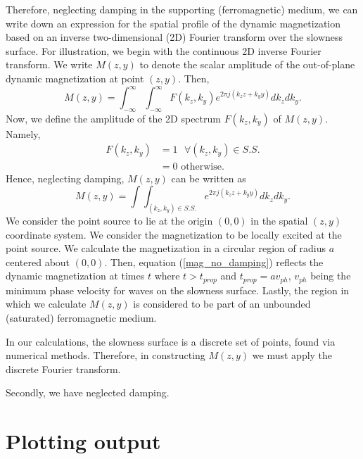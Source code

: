 \documentclass{article}
\begin{document}
Therefore, neglecting damping in the supporting (ferromagnetic) medium, we can write down an expression for the spatial profile of the dynamic magnetization based on an inverse two-dimensional (2D) Fourier transform over the slowness surface. 
For illustration, we begin with the continuous 2D inverse Fourier transform.
We write $M(z , y)$ to denote the scalar amplitude of the out-of-plane dynamic magnetization at point $(z, y)$. Then,
\begin{equation}
M(z,y) = \int_{-\infty}^{\infty} \int_{-\infty}^{\infty} F(k_{z},k_{y}) e^{2 \pi j (k_{z} z + k_{y} y)} dk_{z} dk_{y} .
\end{equation}
Now, we define the amplitude of the 2D spectrum $F(k_{z},k_{y})$ of $M(z , y)$. Namely,
\begin{align}
F(k_{z},k_{y}) &= 1 \text{  } \forall (k_{z},k_{y}) \in S.S. \\
&= 0 \text{ otherwise.}
\end{align}
Hence, neglecting damping, $M(z, y)$ can be written as
\begin{equation}\label{mag_no_damping}
M(z,y) = \int\int_{(k_{z},k_{y}) \in S.S.} e^{2 \pi j (k_{z} z + k_{y} y)} dk_{z} dk_{y} .
\end{equation}
We consider the point source to lie at the origin $(0,0)$ in the spatial $(z,y)$ coordinate system. We consider the magnetization to be locally excited at the point source. We calculate the magnetization in a circular region of radius $a$ centered about $(0,0)$. Then, equation (\ref{mag_no_damping}) reflects the dynamic magnetization at times $t$ where $t > t_{prop}$ and $t_{prop} = a v_{ph}$, $v_{ph}$ being the minimum phase velocity for waves on the slowness surface. Lastly, the region in which we calculate $M(z, y)$ is considered to be part of an unbounded (saturated) ferromagnetic medium.

In our calculations, the slowness surface is a discrete set of points, found via numerical methods. Therefore, in constructing $M(z,y)$ we must apply the discrete Fourier transform.

Secondly, we have neglected damping.

\section{Plotting output}
\end{document}
